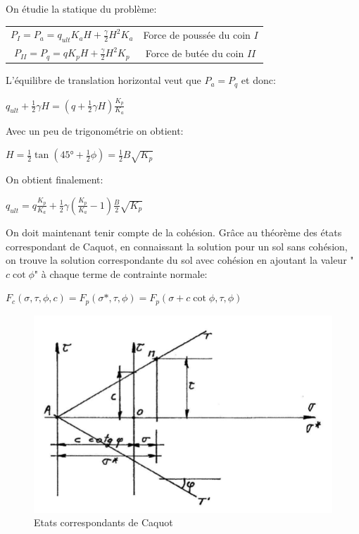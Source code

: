         On étudie la statique du problème: 
        \begin{center}
            \begin{tabular}{c|c}
                $ P_{I} = P_a = q_{ult}K_a H + \frac{\gamma}{2} H^2 K_a $ &  Force de poussée du coin $I$ \\
                $ P_{II} = P_q = qK_p H + \frac{\gamma}{2} H^2 K_p $ &  Force de butée du coin $II$ 
            \end{tabular}
        \end{center}
        
        L'équilibre de translation horizontal veut que $P_a = P_q$ et donc:
        \begin{center}
            $q_{ult} + \frac{1}{2} \gamma H = (q + \frac{1}{2} \gamma H) \frac{K_p}{K_a}$
        \end{center} 
        
        Avec un peu de trigonométrie on obtient:
        \begin{center}
            $H = \frac{1}{2} \tan(45° + \frac{1}{2} \phi) = \frac{1}{2} B \sqrt{K_p}$
        \end{center}
        
        On obtient finalement:
        \begin{center}
            $q_{ult} = q \frac{K_p}{K_a} + \frac{1}{2} \gamma (\frac{K_p}{K_a} - 1) \frac{B}{2} \sqrt{K_p}$
        \end{center}
        
        On doit maintenant tenir compte de la cohésion. Grâce au théorème des états correspondant de Caquot, en connaissant la solution pour un sol sans cohésion, on trouve la solution correspondante du sol avec cohésion en ajoutant la valeur "$c \cot \phi$" à chaque terme de contrainte normale:
        
        \begin{center}
            $F_c(\sigma, \tau, \phi, c) = F_p(\sigma*,\tau,\phi) = F_p(\sigma + c \cot \phi, \tau, \phi)$
        \end{center}
        
        \begin{figure}[h!]
            \center
            \includegraphics[scale=0.6]{Holeyman/images/H20.PNG}
            \caption{Etats correspondants de Caquot}
        \end{figure}
        

